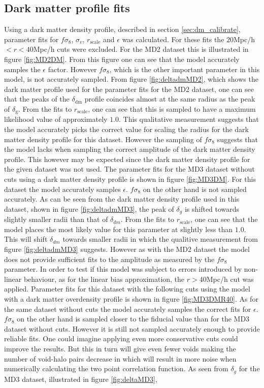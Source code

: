 \subsection{Dark matter profile fits}
Using a dark matter density profile, described in section \ref{sec:dm_calibrate}, parameter fits for $f\sigma_8$, $\sigma_v$, $r_\mathrm{scale}$ and $\epsilon$ was calculated. For these fits the $20$Mpc/h$<r<40$Mpc/h cuts were excluded. For the MD2 dataset this is illustrated in figure \ref{fig:MD2DM}. From this figure one can see that the model accurately samples the $\epsilon$ factor. However $f\sigma_8$, which is the other important parameter in this model, is not accurately sampled. From figure \ref{fig:deltadmMD2}, which shows the dark matter profile used for the parameter fits for the MD2 dataset, one can see that the peaks of the $\delta_{\mathrm{dm}}$ profile coincides almost at the same radius as the peak of $\delta_\mathrm{g}$. From the fits to $r_\mathrm{scale}$, one can see that this is sampled to have a maximum likelihood value of approximately $1.0$. This qualitative measurement suggests that the model accurately picks the correct value for scaling the radius for the dark matter density profile for this dataset. However the sampling of $f\sigma_8$ suggests that the model lacks when sampling the correct amplitude of the dark matter density profile. This however may be expected since the dark matter density profile for the given dataset was not used. The parameter fits for the MD3 dataset without cuts using a dark matter density profile is shown in figure \ref{fig:MD3DM}. For this dataset the model accurately samples $\epsilon$. $f\sigma_8$ on the other hand is not sampled accurately. As can be seen from the dark matter density profile used in this dataset, shown in figure \ref{fig:deltadmMD3}, the peak of $\delta_g$ is shifted towards slightly smaller radii than that of $\delta_{dm}$. From the fits to $r_{\mathrm{scale}}$, one can see that the model places the most likely value for this parameter at slightly less than $1.0$. This will shift $\delta_{dm}$ towards smaller radii in which the qualitive measurement from figure \ref{fig:deltadmMD3} suggests. However as with the MD2 dataset the model does not provide sufficient fits to the amplitude as measured by the $f\sigma_8$ parameter. In order to test if this model was subject to errors introduced by non-linear behaviour, as for the linear bias approximation, the $r>40$Mpc/h cut was applied. Parameter fits for this dataset with the following cuts using the model with a dark matter overdensity profile is shown in figure \ref{fig:MD3DMR40}. As for the same dataset without cuts the model accurately samples the correct fits for $\epsilon$. $f\sigma_8$ on the other hand is sampled closer to the fiducial value than for the MD3 dataset without cuts. However it is still not sampled accurately enough to provide reliable fits. One could imagine applying even more conservative cuts could improve the results. But this in turn will give even fewer voids making the number of void-halo pairs decrease in which will result in more noise when numerically calculating the two point correlation function. As seen from $\delta_g$ for the MD3 dataset, illustrated in figure \ref{fig:deltaMD3}, 